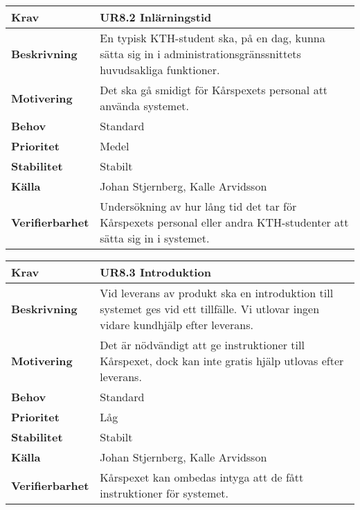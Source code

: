 \documentclass[a4paper, twoside, 11pt, titlepage]{article}
\begin{document}
		\begin {table} [ht] \begin{tabular} { p{2.6cm} p{12.5cm} }
			\hline
			{\sffamily\textbf{Krav}} & {\sffamily\textbf{UR8.2 Inlärningstid}} \\
			\hline
			{\sffamily\textbf{Beskrivning}} & {En typisk KTH-student ska, på en dag, kunna sätta sig in i administrationsgränssnittets huvudsakliga funktioner.} \\
			\hline
			{\sffamily\textbf{Motivering}} & {Det ska gå smidigt för Kårspexets personal att använda systemet.} \\
			\hline
			{\sffamily\textbf{Behov}} & {Standard} \\
			\hline
			{\sffamily\textbf{Prioritet}} & {Medel} \\
			\hline
			{\sffamily\textbf{Stabilitet}} & {Stabilt} \\
			\hline
			{\sffamily\textbf{Källa}} & {Johan Stjernberg, Kalle Arvidsson} \\
			\hline
			{\sffamily\textbf{Verifierbarhet}} & {Undersökning av hur lång tid det tar för Kårspexets personal eller andra KTH-studenter att sätta sig in i systemet.} \\
			\hline
		\end{tabular} \end{table} \FloatBarrier
		\vspace{6mm}

		\begin {table} [ht] \begin{tabular} { p{2.6cm} p{12.5cm} }
			\hline
			{\sffamily\textbf{Krav}} & {\sffamily\textbf{UR8.3 Introduktion}} \\
			\hline
			{\sffamily\textbf{Beskrivning}} & {Vid leverans av produkt ska en introduktion till systemet ges vid ett tillfälle. Vi utlovar ingen vidare kundhjälp efter leverans.} \\
			\hline
			{\sffamily\textbf{Motivering}} & {Det är nödvändigt att ge instruktioner till Kårspexet, dock kan inte gratis hjälp utlovas efter leverans.} \\
			\hline
			{\sffamily\textbf{Behov}} & {Standard} \\
			\hline
			{\sffamily\textbf{Prioritet}} & {Låg} \\
			\hline
			{\sffamily\textbf{Stabilitet}} & {Stabilt} \\
			\hline
			{\sffamily\textbf{Källa}} & {Johan Stjernberg, Kalle Arvidsson} \\
			\hline
			{\sffamily\textbf{Verifierbarhet}} & {Kårspexet kan ombedas intyga att de fått instruktioner för systemet.} \\
			\hline
		\end{tabular} \end{table} \FloatBarrier
		\vspace{6mm}
\end{document}
